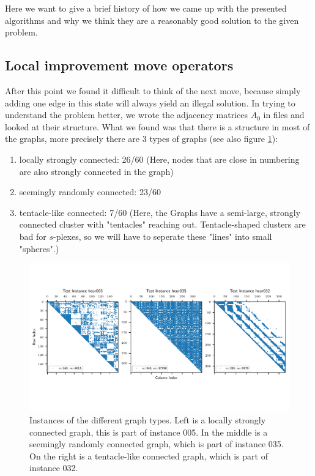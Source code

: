 Here we want to give a brief history of how we came up with the presented algorithms and why we think they are a reasonably good solution to the given problem.\\

\subsection{Local improvement move operators}
After this point we found it difficult to think of the next move, because simply adding one edge in this state will always yield an illegal solution. In trying to understand the problem better, we wrote the adjacency matrices $A_0$ in files and looked at their structure. What we found was that there is a structure in most of the graphs, more precisely there are 3 types of graphs (see also figure \ref{fig:types}):
\begin{enumerate}
    \item locally strongly connected: 26/60 (Here, nodes that are close in numbering are also strongly connected in the graph)
    \item seemingly randomly connected: 23/60
    \item tentacle-like connected: 7/60 (Here, the Graphs have a semi-large, strongly connected cluster with "tentacles" reaching out. Tentacle-shaped clusters are bad for $s$-plexes, so we will have to seperate these "lines" into small "spheres".)
\end{enumerate}

\begin{figure}[h]
    \centering
    \includegraphics[width=\linewidth, trim= {0 1.8cm 0 1.8cm}, clip]{figures/spy_adjacency.pdf}
    \caption{\label{fig:types}Instances of the different graph types. Left is a locally strongly 
    connected graph, this is part of instance 005. In the middle is a seemingly randomly connected graph, 
    which is part of instance 035. On the right is a tentacle-like connected graph, which is part of instance 032.}
\end{figure}

